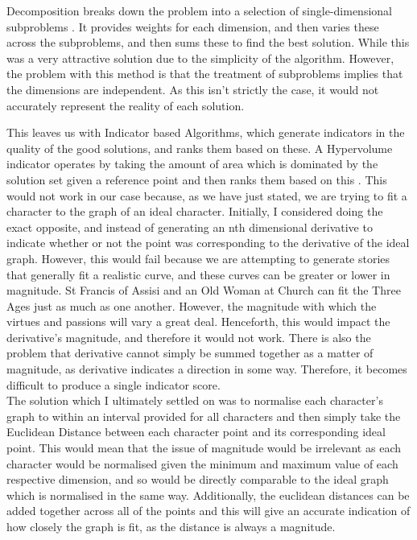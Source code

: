 \documentclass[11pt]{article}
\begin{document}
Decomposition breaks down the problem into a selection of single-dimensional subproblems \cite{MOEAD}. It provides weights for each dimension, and then varies these across the subproblems, and then sums these to find the best solution. While this was a very attractive solution due to the simplicity of the algorithm. However, the problem with this method is that the treatment of subproblems implies that the dimensions are independent. As this isn't strictly the case, it would not accurately represent the reality of each solution. 

This leaves us with Indicator based Algorithms, which generate indicators in the quality of the good solutions, and ranks them based on these. A Hypervolume indicator operates by taking the amount of area which is dominated by the solution set given a reference point and then ranks them based on this \cite{AchievementScalarazingIndicatorBased}. This would not work in our case because, as we have just stated, we are trying to fit a character to the graph of an ideal character. Initially, I considered doing the exact opposite, and instead of generating an nth dimensional derivative to indicate whether or not the point was corresponding to the derivative of the ideal graph. However, this would fail because we are attempting to generate stories that generally fit a realistic curve, and these curves can be greater or lower in magnitude. St Francis of Assisi and an Old Woman at Church can fit the Three Ages just as much as one another. However, the magnitude with which the virtues and passions will vary a great deal. Henceforth, this would impact the derivative's magnitude, and therefore it would not work. There is also the problem that derivative cannot simply be summed together as a matter of magnitude, as derivative indicates a direction in some way. Therefore, it becomes difficult to produce a single indicator score.  \\

The solution which I ultimately settled on was to normalise each character's graph to within an interval provided for all characters and then simply take the Euclidean Distance between each character point and its corresponding ideal point. This would mean that the issue of magnitude would be irrelevant as each character would be normalised given the minimum and maximum value of each respective dimension, and so would be directly comparable to the ideal graph which is normalised in the same way. Additionally, the euclidean distances can be added together across all of the points and this will give an accurate indication of how closely the graph is fit, as the distance is always a magnitude. 
\end{document}
